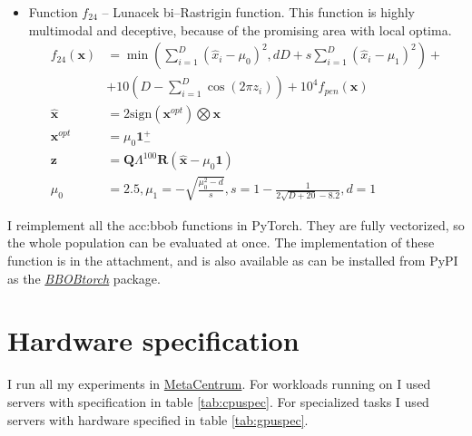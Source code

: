 \begin{itemize}
\begin{align*}
\begin{array}{ll}
\begin{array}{l}
                        \text{sampled randomly without} \\
                        \text{replacement for}\ i \neq 1
                    \end{array}
            \end{array}
        \right.
    \end{align*}
    \item Function $f_{24}$ -- Lunacek bi--Rastrigin function. This function is highly multimodal and deceptive, because of the promising area with local optima.
    \begin{align*}
        f_{24}\left(\mathbf{x}\right) &=
            \min\left( \sum_{i=1}^D\left(\hat{x}_i-\mu_0\right)^2, dD+s\sum_{i=1}^D\left(\hat{x}_i-\mu_1\right)^2 \right) + \\
            &+ 10\left(D-\sum_{i=1}^D \cos\left(2\pi z_i\right)\right)
            + 10^4 f_{pen}\left(\mathbf{x}\right) \\
        \hat{\mathbf{x}} &= 2 \text{sign}\left(\mathbf{x}^{opt}\right) \bigotimes \mathbf{x} \\
        \mathbf{x}^{opt} &= \mu_0 \mathbf{1}^{+}_{-} \\
        \mathbf{z} &= \mathbf{Q}\Lambda^{100}\mathbf{R}\left(\hat{\mathbf{x}}-\mu_0\mathbf{1}\right) \\
        \mu_0&=2.5,\mu_1=-\sqrt{\frac{\mu_0^2-d}{s}}, s=1-\frac{1}{2\sqrt{D+20}-8.2},d=1
    \end{align*}
\end{itemize}

I reimplement all the \acrshort{acc:bbob} functions in PyTorch. They are fully vectorized, so the whole population can be evaluated at once. The implementation of these function is in the attachment, and is also available as can be installed from PyPI as the \href{https://pypi.org/project/BBOBtorch/}{\textit{BBOBtorch}} package.



\section{Hardware specification}

I run all my experiments in \href{https://metavo.metacentrum.cz/en/}{MetaCentrum}. For workloads running on \cpu I used servers with specification in table \ref{tab:cpuspec}. For \gpu specialized tasks I used servers with hardware specified in table \ref{tab:gpuspec}.



